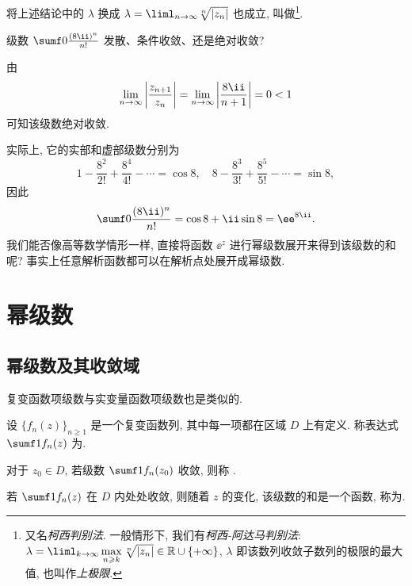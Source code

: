 将上述结论中的 $\lambda$ 换成 \alert{$\lambda=\liml_{n\ra\infty}\sqrt[n]{\abs{z_n}}$} 也成立, 叫做\footnote{
  又名\emph{柯西判别法}.
  一般情形下, 我们有\emph{柯西-阿达马判别法}: 
  $\lambda=\liml_{k\ra\infty}\max\limits_{n\ge k}\sqrt[n]{\abs{z_n}}\in\BR\cup\{+\infty\}$, $\lambda$ 即该数列收敛子数列的极限的最大值, 也叫作\emph{上极限}.
}.

\begin{example}
  级数 $\sumf0 \frac{(8\ii)^n}{n!}$ 发散、条件收敛、还是绝对收敛?
\end{example}

\begin{solution}
  由
  \[
     \lim_{n\ra\infty}\abs{\frac{z_{n+1}}{z_n}}
    =\lim_{n\ra\infty}\abs{\dfrac{8\ii}{n+1}}
    =0<1
  \]
  可知该级数绝对收敛.
\end{solution}

实际上, 它的实部和虚部级数分别为
\[
  1-\frac{8^2}{2!}+\frac{8^4}{4!}-\cdots=\cos 8,\quad
  8-\frac{8^3}{3!}+\frac{8^5}{5!}-\cdots=\sin 8,
\]
因此
\[
   \sumf0 \frac{(8\ii)^n}{n!}
  =\cos 8+\ii \sin 8
  =\ee^{8\ii}.
\]
我们能否像高等数学情形一样, 直接将函数 $\ee^z$ 进行幂级数展开来得到该级数的和呢?
事实上任意解析函数都可以在解析点处展开成幂级数.



\section{幂级数}

\subsection{幂级数及其收敛域}

复变函数项级数与实变量函数项级数也是类似的.

\begin{definition}
  \begin{enuma}
    \item 设 $\bigl\{f_n(z)\bigr\}_{n\ge 1}$ 是一个复变函数列, 其中每一项都在区域 $D$ 上有定义.
    称表达式 $\sumf1 f_n(z)$ 为.
    \item 对于 $z_0\in D$, 若级数 $\sumf1 f_n(z_0)$ 收敛, 则称 .
    \item 若 $\sumf1 f_n(z)$ 在 $D$ 内处处收敛, 则随着 $z$ 的变化, 该级数的和是一个函数, 称为.
  \end{enuma}
\end{definition}

